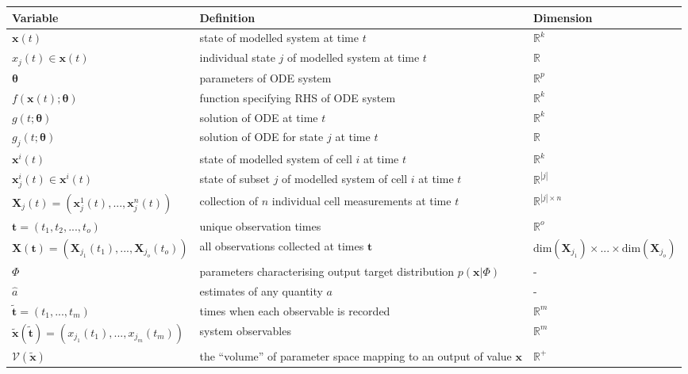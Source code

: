 \documentclass[10pt,letterpaper]{article}
\begin{document}
\begin{table}[htbp]
	\centering
	\scriptsize
	\begin{adjustwidth}{-2in}{-1in}%
		\begin{tabularx}{1.65\textwidth}{lll}
			Variable	& Definition & Dimension\\
			\toprule
			$\boldsymbol{x}(t)$	& state of modelled system at time $t$ & $\mathbb{R}^k$\\
			$x_j(t)\in \boldsymbol{x}(t)$ & individual state $j$ of modelled system at time $t$ & $\mathbb{R}$\\
			$\boldsymbol{\theta}$ & parameters of ODE system & $\mathbb{R}^p$\\
			$f(\boldsymbol{x}(t); \boldsymbol{\theta})$	& function specifying RHS of ODE system & $\mathbb{R}^k$\\
			$g(t; \boldsymbol{\theta})$	&  solution of ODE at time $t$ & $\mathbb{R}^k$\\
			$g_j(t; \boldsymbol{\theta})$	&  solution of ODE for state $j$ at time $t$ & $\mathbb{R}$\\
			$\boldsymbol{x}^i(t)$ &  state of modelled system of cell $i$ at time $t$ & $\mathbb{R}^k$\\
			$\boldsymbol{x}_j^i(t)\in\boldsymbol{x}^i(t)$ & state of subset $j$ of modelled system of cell $i$ at time $t$ & $\mathbb{R}^{|j|}$ \\
			$\boldsymbol{X}_j(t)=(\boldsymbol{x}^1_j(t),...,\boldsymbol{x}^n_j(t))$ & collection of $n$ individual cell measurements at time $t$ & $\mathbb{R}^{|j|\times n}$\\
			$\boldsymbol{t}=(t_1, t_2, ..., t_o)$ & unique observation times & $\mathbb{R}^o$\\
			$\boldsymbol{X}(\boldsymbol{t})=(\boldsymbol{X}_{j_1}(t_1), ..., \boldsymbol{X}_{j_o}(t_o))$ & all observations collected at times $\boldsymbol{t}$ & $\text{dim}(\boldsymbol{X}_{j_1}) \times ... \times \text{dim}(\boldsymbol{X}_{j_o})$\\
			$\Phi$ & parameters characterising output target distribution $p(\boldsymbol{x}|\Phi)$ & -\\
			$\hat{a}$ & estimates of any quantity $a$ & -\\
			$\tilde{\boldsymbol{t}}=(t_1,...,t_m)$ & times when each observable is recorded & $\mathbb{R}^m$\\
			$\tilde{\boldsymbol{x}}(\tilde{\boldsymbol{t}})=(x_{j_1}(t_1), ..., x_{j_m}(t_m))$ & system observables & $\mathbb{R}^m$\\
			$\mathcal{V}(\tilde{\boldsymbol{x}})$ & the ``volume'' of parameter space mapping to an output of value $\boldsymbol{x}$ &  $\mathbb{R}^+$\\

\end{tabularx}
\end{adjustwidth}
\end{table}
\end{document}
